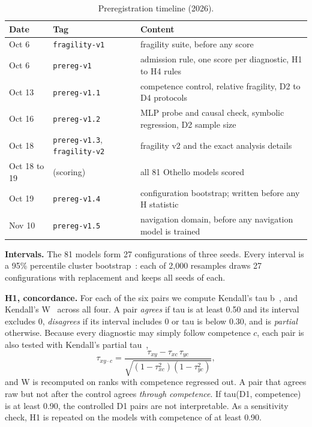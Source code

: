 \documentclass[journal]{IEEEtran}
\begin{document}
\begin{table}[t]
    \centering
    \caption{Preregistration timeline (2026).}
    \label{tab:prereg}
    \footnotesize
    \setlength{\tabcolsep}{3pt}
    \begin{tabular}{l>{\raggedright\arraybackslash}p{2.3cm}>{\raggedright\arraybackslash}p{4.3cm}}
    \toprule
    Date & Tag & Content \\
    \midrule
    Oct 6 & \texttt{fragility-v1} & fragility suite, before any score \\
    Oct 6 & \texttt{prereg-v1} & admission rule, one score per diagnostic, H1 to H4 rules \\
    Oct 13 & \texttt{prereg-v1.1} & competence control, relative fragility, D2 to D4 protocols \\
    Oct 16 & \texttt{prereg-v1.2} & MLP probe and causal check, symbolic regression, D2 sample size \\
    Oct 18 & \texttt{prereg-v1.3}, \texttt{fragility-v2} & fragility v2 and the exact analysis details \\
    Oct 18 to 19 & (scoring) & all 81 Othello models scored \\
    Oct 19 & \texttt{prereg-v1.4} & configuration bootstrap; written before any H statistic \\
    Nov 10 & \texttt{prereg-v1.5} & navigation domain, before any navigation model is trained \\
    \bottomrule
    \end{tabular}
\end{table}

\textbf{Intervals.} The 81 models form 27 configurations of three seeds. Every interval is a 95\% percentile
cluster bootstrap~\cite{cameron2008bootstrap}: each of 2,000 resamples draws 27 configurations with replacement and
keeps all seeds of each.

\textbf{H1, concordance.} For each of the six pairs we compute Kendall's tau b~\cite{kendall1938tau}, and Kendall's
W~\cite{kendall1939w} across all four. A pair \emph{agrees} if tau is at least 0.50 and its interval excludes 0,
\emph{disagrees} if its interval includes 0 or tau is below 0.30, and is \emph{partial} otherwise. Because every
diagnostic may simply follow competence $c$, each pair is also tested with Kendall's partial
tau~\cite{kendall1942partial},
\begin{equation}
  \tau_{xy\cdot c}=\frac{\tau_{xy}-\tau_{xc}\,\tau_{yc}}{\sqrt{(1-\tau_{xc}^{2})(1-\tau_{yc}^{2})}},
\end{equation}
and W is recomputed on ranks with competence regressed out. A pair that agrees raw but not after the control
agrees \emph{through competence}. If tau(D1, competence) is at least 0.90, the controlled D1 pairs are not
interpretable. As a sensitivity check, H1 is repeated on the models with competence of at least 0.90.
\end{document}
